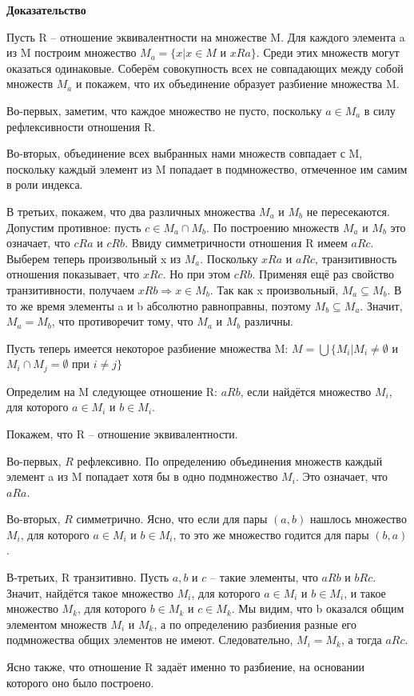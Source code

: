 \documentclass[a4paper]{article}
\begin{document}
\begin{hproof}
\textbf{Доказательство}

Пусть R –
отношение эквивалентности на множестве M. Для каждого элемента a из M построим множество $M_a = \{x | x \in M$ и $x R a\}$. Среди этих множеств могут
оказаться одинаковые. Соберём совокупность всех не совпадающих между
собой множеств $M_a$ и покажем, что их объединение образует разбиение множества M. 

Во-первых, заметим, что каждое множество не пусто, поскольку $a \in M_a$ в
силу рефлексивности отношения R.

Во-вторых, объединение всех выбранных нами множеств совпадает с M,
поскольку каждый элемент из M попадает в подмножество, отмеченное им
самим в роли индекса.

В третьих, покажем, что два различных множества $M_a$ и $M_b$ не пересекаются.
Допустим противное: пусть $c \in M_a \cap M_b$. По построению множеств $M_a$ и $M_b$ это
означает, что $c R a$ и $c R b$. Ввиду симметричности отношения R имеем $a R c$.
Выберем теперь произвольный x из $M_a$. Поскольку $x R a$ и $a R c$, транзитивность
отношения показывает, что $x R c$. Но при этом $c R b$. Применяя ещё раз свойство
транзитивности, получаем $x R b \Rightarrow x \in M_b$. Так как x произвольный, $M_a \subseteq M_b$. В то же время элементы a и b абсолютно
равноправны, поэтому $M_b \subseteq M_a$. Значит, $M_a = M_b$, что противоречит тому, что $M_a$ и $M_b$ различны.

Пусть теперь имеется некоторое разбиение множества M:
$M = \bigcup \{ M_i | M_i \neq \emptyset$ и $M_i \cap M_j = \emptyset$ при $i \neq j\}$

Определим на M следующее отношение R: $aRb$, если найдётся множество $M_i$, для которого $a \in M_i$ и $b \in M_i$.

Покажем, что R – отношение эквивалентности.

Во-первых, $R$ рефлексивно. По определению объединения множеств каждый
элемент a из M попадает хотя бы в одно подмножество $M_i$. Это означает, что
$aRa$.

Во-вторых, $R$ симметрично. Ясно, что если для пары $(a, b)$ нашлось
множество $M_i$, для которого $a \in M_i$ и $b \in M_i$, то это же множество годится для
пары $(b, a)$.

В-третьих, R транзитивно. Пусть $a, b$ и $c$ – такие элементы, что $aRb$ и $bRc$.
Значит, найдётся такое множество $M_i$, для которого $a \in M_i$ и $b \in M_i$, и такое
множество $M_k$, для которого $b \in M_k$ и $c \in M_k$. Мы видим, что b оказался общим
элементом множеств $M_i$ и $M_k$, а по определению разбиения разные его
подмножества общих элементов не имеют. Следовательно, $M_i = M_k$, а тогда $aRc$.

Ясно также, что отношение R задаёт именно то разбиение, на основании
которого оно было построено.


\end{hproof}
\end{document}
